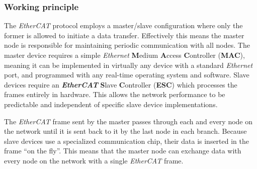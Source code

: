 \subsubsection{Working principle} \label{sec:ecat_principle}

The \emph{EtherCAT} protocol employs a master/slave configuration where only the former is allowed to initiate a data transfer.
Effectively this means the master node is responsible for maintaining periodic communication with all nodes.
The master device requires a simple \emph{Ethernet} \textbf Medium \textbf Access \textbf Controller ({\bfseries MAC}), meaning it can be implemented in virtually any device with a standard \emph{Ethernet} port, and programmed with any real-time operating system and software.
Slave devices require an \textbf \emph{EtherCAT} \textbf Slave \textbf Controller ({\bfseries ESC}) which processes the frames entirely in hardware.
This allows the network performance to be predictable and independent of specific slave device implementations.

The \emph{EtherCAT} frame sent by the master passes through each and every node on the network until it is sent back to it by the last node in each branch.
Because slave devices use a specialized communication chip, their data is inserted in the frame ``on the fly''.
This means that the master node can exchange data with every node on the network with a single \emph{EtherCAT} frame.
